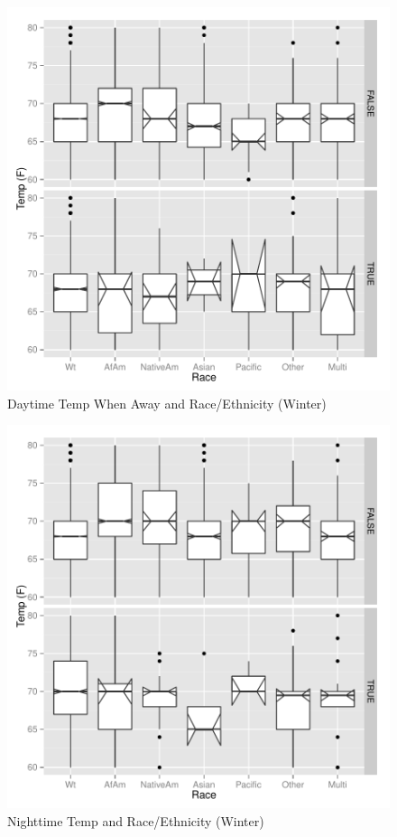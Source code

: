 \documentclass{article}
\begin{document}
\begin{figure}
\begin{center}
\caption{Daytime Temp When Away and Race/Ethnicity (Winter)}
\label{fig:DayAwayRace}
\includegraphics{DraftEdwardsWoods-013}
\end{center}
\end{figure}


\begin{figure}
\begin{center}
\caption{Nighttime Temp and Race/Ethnicity (Winter)}
\label{fig:NightRace}
\includegraphics{DraftEdwardsWoods-014}
\end{center}
\end{figure}
\end{document}
